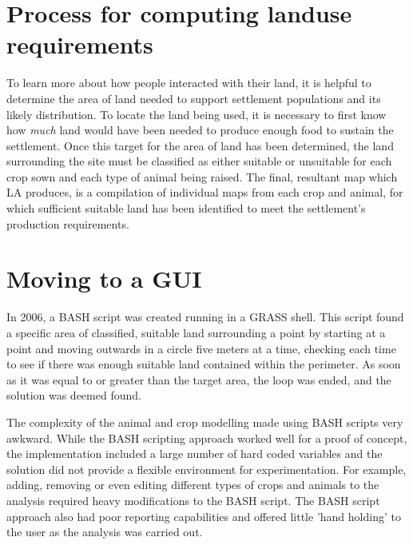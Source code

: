 \section{Process for computing landuse requirements} 
\label{sec:EarlyAttempts} 
  To learn more about how people interacted with their land, it is
  helpful to determine the area of land needed to support settlement
  populations and its likely distribution.  To locate the land being used, it is
  necessary to first know how \textit{much} land would have been needed to
  produce enough food to sustain the settlement.  Once this target for the area of land
  has been determined, the land surrounding the site must be classified as
  either suitable or unsuitable for each crop sown and each type of animal being
  raised.  The final, resultant map which LA produces, is a compilation of individual
  maps from each crop and animal, for which sufficient suitable land has been
  identified to meet the settlement's production requirements.
\section{Moving to a GUI} \label{GUI} 
  In  2006, a BASH script was created running in a GRASS shell. This script
  found a specific area of classified, suitable land surrounding a point by
  starting at a point and moving outwards in a circle five meters at a time,
  checking each time to see if there was enough suitable land contained within
  the perimeter. As soon as it was equal to or greater than the target area, the
  loop was ended, and the solution was deemed found.

  The complexity of the animal and crop modelling made using BASH scripts very
  awkward.  While the BASH scripting approach worked well for a proof of
  concept, the implementation included a large number of hard coded variables and the
  solution did not provide a flexible environment for experimentation. For
  example, adding, removing or even editing different types of crops and animals
  to the analysis required heavy modifications to the BASH script.  The BASH
  script approach also had poor reporting capabilities and offered
  little 'hand holding' to the user as the analysis was carried out.

